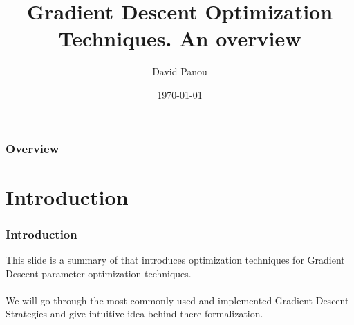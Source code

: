\documentclass{beamer}
\title[Gradient Descent Optimization Technics. An overview]{Gradient Descent Optimization Techniques. An overview} %
\author{David Panou} %
\institute[Pierre \& Marie Curie University] %
{
Pierre \& Marie Curie University \\ %
\medskip
\textit{david.panou@gmail.com} %
}
\date{\today} %
\begin{document}
\begin{frame}
\titlepage %
\end{frame}

\begin{frame}
\frametitle{Overview} %
\tableofcontents %
\end{frame}




  

\section{Introduction} %


\begin{frame}
\frametitle{Introduction}
This slide is a summary of \cite{Ruder} that introduces optimization techniques for Gradient Descent parameter optimization techniques.\\~\\
We will go through the most commonly used and implemented Gradient Descent Strategies and give intuitive idea behind there formalization.

\end{frame}
\end{document}
